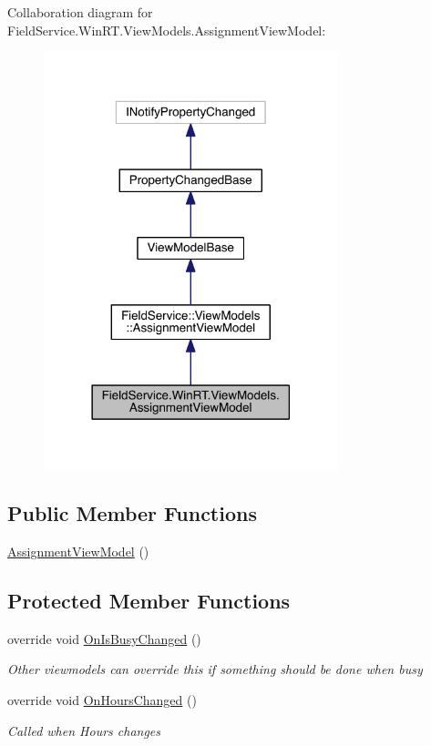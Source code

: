 Collaboration diagram for Field\+Service.\+Win\+R\+T.\+View\+Models.\+Assignment\+View\+Model\+:
\nopagebreak
\begin{figure}[H]
\begin{center}
\leavevmode
\includegraphics[width=242pt]{class_field_service_1_1_win_r_t_1_1_view_models_1_1_assignment_view_model__coll__graph}
\end{center}
\end{figure}
\subsection*{Public Member Functions}
\begin{DoxyCompactItemize}
\item 
\hyperlink{class_field_service_1_1_win_r_t_1_1_view_models_1_1_assignment_view_model_a8eb479716c5b035c325960855c7444b8}{Assignment\+View\+Model} ()
\end{DoxyCompactItemize}
\subsection*{Protected Member Functions}
\begin{DoxyCompactItemize}
\item 
override void \hyperlink{class_field_service_1_1_win_r_t_1_1_view_models_1_1_assignment_view_model_a777f81b7d56eabe3d582822b1584b4fe}{On\+Is\+Busy\+Changed} ()
\begin{DoxyCompactList}\small\item\em Other viewmodels can override this if something should be done when busy \end{DoxyCompactList}\item 
override void \hyperlink{class_field_service_1_1_win_r_t_1_1_view_models_1_1_assignment_view_model_a9c33381d84cb09938ac3c7f5434b9ff7}{On\+Hours\+Changed} ()
\begin{DoxyCompactList}\small\item\em Called when Hours changes \end{DoxyCompactList}\end{DoxyCompactItemize}
